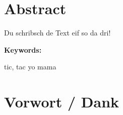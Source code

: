 \section*{Abstract}

Du schribsch de Text eif so da dri!

\vspace{2ex}

\textbf{Keywords:}

tic, tac yo mama

\clearpage

\section*{Vorwort / Dank}

\lipsum[2-5]

